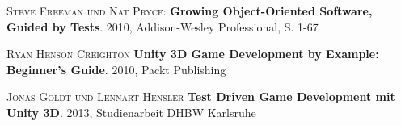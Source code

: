 \begin{thebibliography}{---}

  \textsc{Steve Freeman und Nat Pryce}: 
  \textbf{Growing Object-Oriented Software, Guided by Tests}.
  2010, Addison-Wesley Professional, S. 1-67
    
  \textsc{Ryan Henson Creighton}
  \textbf{Unity 3D Game Development by Example: Beginner's Guide}.
  2010, Packt Publishing
      
  \textsc{Jonas Goldt und Lennart Hensler}
  \textbf{Test Driven Game Development mit Unity 3D}.
  2013, Studienarbeit DHBW Karlsruhe

\end{thebibliography}

